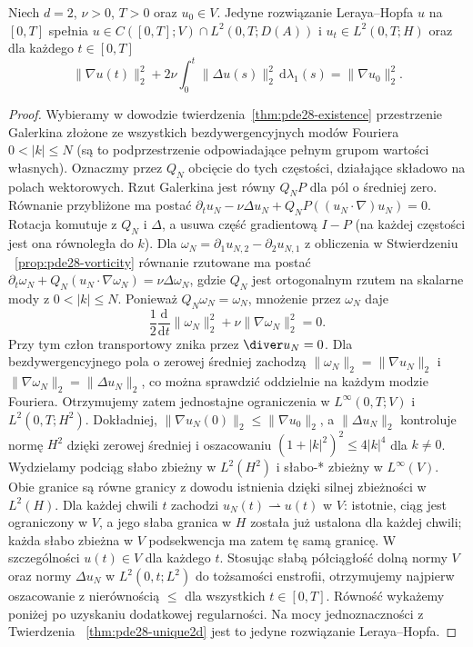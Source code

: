 \begin{twierdzenie}
\label{thm:pde28-H1-2d}
Niech $d=2$, $\nu>0$, $T>0$ oraz $u_0\in V$.
Jedyne rozwiązanie Leraya--Hopfa $u$ na $[0,T]$ spełnia
$u\in C([0,T];V)\cap L^2(0,T;D(A))$
i $u_t\in L^2(0,T;H)$
oraz dla każdego $t\in[0,T]$
\[
 \|\nabla u(t)\|_2^2+2\nu\int_0^t\|\Delta u(s)\|_2^2
 \,\mathrm d\lambda_1(s)=\|\nabla u_0\|_2^2.
\]
\end{twierdzenie}
\begin{proof}
Wybieramy w dowodzie twierdzenia~\ref{thm:pde28-existence}
przestrzenie Galerkina złożone ze wszystkich bezdywergencyjnych
modów Fouriera $0<|k|\le N$ (są to podprzestrzenie
odpowiadające pełnym grupom wartości własnych).
Oznaczmy przez $Q_N$ obcięcie do tych częstości,
działające składowo na polach wektorowych.
Rzut Galerkina jest równy $Q_NP$ dla pól o średniej zero.
Równanie przybliżone ma postać
$\partial_t u_N-\nu\Delta u_N+
Q_NP((u_N\cdot\nabla)u_N)=0$.
Rotacja komutuje z $Q_N$ i $\Delta$, a usuwa
część gradientową $I-P$ (na każdej częstości
jest ona równoległa do $k$).
Dla $\omega_N=\partial_1u_{N,2}
-\partial_2u_{N,1}$ z obliczenia w Stwierdzeniu
~\ref{prop:pde28-vorticity} równanie rzutowane ma postać
$\partial_t\omega_N+Q_N(u_N\cdot\nabla\omega_N)
=\nu\Delta\omega_N$, gdzie $Q_N$ jest ortogonalnym
rzutem na skalarne mody z $0<|k|\le N$.
Ponieważ $Q_N\omega_N=\omega_N$, mnożenie przez
$\omega_N$ daje
\[
 \frac12\frac{\mathrm d}{\mathrm dt}\|\omega_N\|_2^2
 +\nu\|\nabla\omega_N\|_2^2=0.
\]
Przy tym człon transportowy znika przez $\diver u_N=0$.
Dla bezdywergencyjnego pola o zerowej średniej zachodzą
$\|\omega_N\|_2=\|\nabla u_N\|_2$ i
$\|\nabla\omega_N\|_2=\|\Delta u_N\|_2$,
co można sprawdzić oddzielnie na każdym modzie Fouriera.
Otrzymujemy zatem jednostajne ograniczenia w
$L^\infty(0,T;V)$ i $L^2(0,T;H^2)$.
Dokładniej, $\|\nabla u_N(0)\|_2\le\|\nabla u_0\|_2$,
a $\|\Delta u_N\|_2$ kontroluje normę $H^2$
dzięki zerowej średniej i oszacowaniu
$(1+|k|^2)^2\le4|k|^4$ dla $k\ne0$.
Wydzielamy podciąg słabo zbieżny w $L^2(H^2)$
i słabo-* zbieżny w $L^\infty(V)$.
Obie granice są równe granicy z dowodu istnienia
dzięki silnej zbieżności w $L^2(H)$.
Dla każdej chwili $t$ zachodzi
$u_N(t)\rightharpoonup u(t)$ w $V$:
istotnie, ciąg jest ograniczony w $V$,
a jego słaba granica w $H$ została już ustalona
dla każdej chwili; każda słabo zbieżna
w $V$ podsekwencja ma zatem tę samą granicę.
W szczególności $u(t)\in V$ dla każdego $t$.
Stosując słabą półciągłość dolną normy $V$
oraz normy $\Delta u_N$ w $L^2(0,t;L^2)$
do tożsamości enstrofii, otrzymujemy najpierw
oszacowanie z nierównością $\le$ dla wszystkich
$t\in[0,T]$. Równość wykażemy poniżej po
uzyskaniu dodatkowej regularności.
Na mocy jednoznaczności z Twierdzenia
~\ref{thm:pde28-unique2d} jest to jedyne
rozwiązanie Leraya--Hopfa.


\end{proof}
